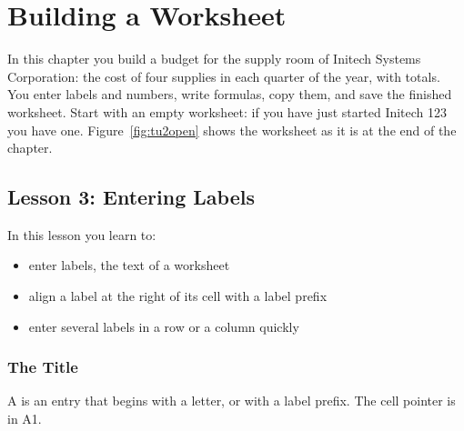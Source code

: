 \chapter{Building a Worksheet}

In this chapter you build a budget for the supply room of Initech Systems
Corporation: the cost of four supplies in each quarter of the year, with
totals.  You enter labels and numbers, write formulas, copy them, and save
the finished worksheet.  Start with an empty worksheet: if you have just
started Initech 123 you have one.  Figure~\ref{fig:tu2open} shows the
worksheet as it is at the end of the chapter.

\section{Lesson 3: Entering Labels}
In this lesson you learn to:
\begin{itemize}
\item enter labels, the text of a worksheet
\item align a label at the right of its cell with a label prefix
\item enter several labels in a row or a column quickly
\end{itemize}

\subsection{The Title}
A  is an entry that begins with a letter, or with a label
prefix.  The cell pointer is in A1.

